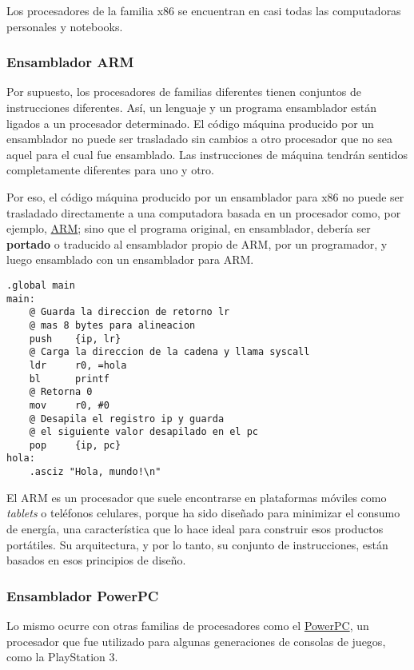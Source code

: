 \documentclass[spanish,A4,]{article}
\begin{document}
Los procesadores de la familia x86 se encuentran en casi todas las
computadoras personales y notebooks.

\subsubsection{Ensamblador ARM}\label{ensamblador-arm}

Por supuesto, los procesadores de familias diferentes tienen conjuntos
de instrucciones diferentes. Así, un lenguaje y un programa ensamblador
están ligados a un procesador determinado. El código máquina producido
por un ensamblador no puede ser trasladado sin cambios a otro procesador
que no sea aquel para el cual fue ensamblado. Las instrucciones de
máquina tendrán sentidos completamente diferentes para uno y otro.

Por eso, el código máquina producido por un ensamblador para x86 no
puede ser trasladado directamente a una computadora basada en un
procesador como, por ejemplo,
\href{https://es.m.wikipedia.org/wiki/Arquitectura sub ARM}{ARM}; sino que
el programa original, en ensamblador, debería ser \textbf{portado} o
traducido al ensamblador propio de ARM, por un programador, y luego
ensamblado con un ensamblador para ARM.

\begin{verbatim}
.global main  
main:  
    @ Guarda la direccion de retorno lr 
    @ mas 8 bytes para alineacion
    push    {ip, lr}  
    @ Carga la direccion de la cadena y llama syscall
    ldr     r0, =hola
    bl      printf  
    @ Retorna 0
    mov     r0, #0 
    @ Desapila el registro ip y guarda
    @ el siguiente valor desapilado en el pc 
    pop     {ip, pc}  
hola:  
    .asciz "Hola, mundo!\n"  
\end{verbatim}

El ARM es un procesador que suele encontrarse en plataformas móviles
como \emph{tablets} o teléfonos celulares, porque ha sido diseñado para
minimizar el consumo de energía, una característica que lo hace ideal
para construir esos productos portátiles. Su arquitectura, y por lo
tanto, su conjunto de instrucciones, están basados en esos principios de
diseño.

\subsubsection{Ensamblador PowerPC}\label{ensamblador-powerpc}

Lo mismo ocurre con otras familias de procesadores como el
\href{https://es.m.wikipedia.org/wiki/PowerPC}{PowerPC}, un procesador
que fue utilizado para algunas generaciones de consolas de juegos, como
la PlayStation 3.
\end{document}
